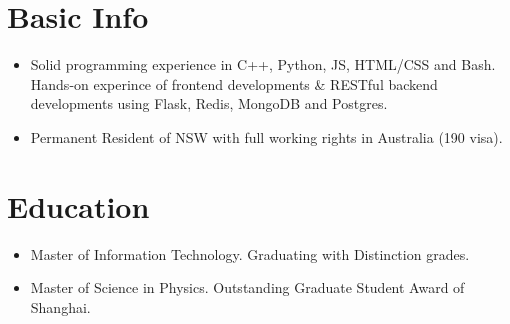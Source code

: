 \documentclass{resume}
\begin{document}

\section{Basic Info}
\begin{itemize}
    \item Solid programming experience in C++, Python, JS, HTML/CSS and Bash. 
    Hands-on experince of frontend developments \& RESTful backend developments using
    Flask, Redis, MongoDB and Postgres. 
    \item Permanent Resident of NSW with full working rights in Australia (190 visa).
\end{itemize}

  

\section{Education}
\begin{itemize}
\item Master of Information Technology. Graduating with Distinction grades.
\end{itemize}

\begin{itemize}
\item  Master of Science in Physics. Outstanding Graduate Student Award of Shanghai.
\end{itemize}
\end{document}

